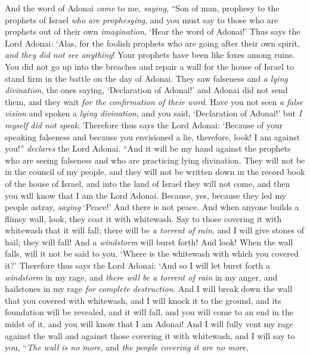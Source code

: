 \begin{biblechapter} %
 And the word of Adonai \textit{came} to me, \textit{saying},
\verse “Son of man, prophesy to the prophets of Israel \textit{who are prophesying}, and you must say to those who are prophets out of their own \textit{imagination}, ‘Hear the word of Adonai!’
\verse Thus says the Lord Adonai: ‘Alas, for the foolish prophets who are going after their own spirit, \textit{and they did not see anything}!
\verse Your prophets have been like foxes among ruins.
\verse You did not go up into the breaches and repair a wall for the house of Israel to stand firm in the battle on the day of Adonai.
\verse They saw falseness and \textit{a lying divination}, the ones saying, ‘Declaration of Adonai!’ and Adonai did not send them, and they wait \textit{for the confirmation of their word}.
\verse Have you not seen \textit{a false vision} and spoken a \textit{lying divination}, and you said, ‘Declaration of Adonai!’ but \textit{I myself did not speak}.
\verse Therefore thus says the Lord Adonai: ‘Because of your speaking falseness and because you envisioned a lie, therefore, look! I am against you!” \textit{declares} the Lord Adonai.
\verse “And it will be my hand against the prophets who are seeing falseness and who are practicing lying divination. They will not be in the council of my people, and they will not be written down in the record book of the house of Israel, and into the land of Israel they will not come, and then you will know that I am the Lord Adonai.
\verse Because, yes, because they led my people astray, \textit{saying} ‘Peace!’ And there is not peace. And when anyone builds a flimsy wall, look, they coat it with whitewash.
\verse Say to those covering it with whitewash that it will fall; there will be \textit{a torrent of rain}, and I will give stones of hail; they will fall!  And a \textit{windstorm} will burst forth!
\verse And look! When the wall falls, will it not be said to you, ‘Where is the whitewash with which you covered it?’
\verse Therefore thus says the Lord Adonai: ‘And so I will let burst forth a \textit{windstorm} in my rage, and \textit{there will be a torrent of rain} in my anger, and hailstones in my rage \textit{for complete destruction}.
\verse And I will break down the wall that you covered with whitewash, and I will knock it to the ground, and its foundation will be revealed, and it will fall, and you will come to an end in the midst of it, and you will know that I am Adonai!
\verse And I will fully vent my rage against the wall and against those covering it with whitewash, and I will say to you, “\textit{The wall is no more}, and \textit{the people covering it are no more},

\end{biblechapter}
